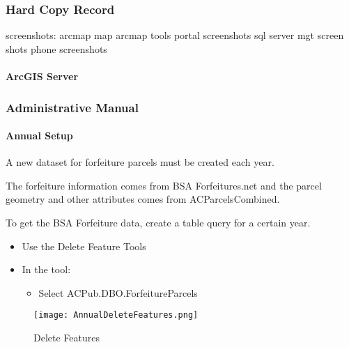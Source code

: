 \documentclass[class=book , crop=false, titlepage, twoside, multi={itemize, figure, verbatim}, float=false]{standalone}
\begin{document}
\subsubsection{Hard Copy Record}
screenshots:
arcmap map
arcmap tools
portal screenshots
sql server mgt screen shots
phone screenshots

\paragraph{ArcGIS Server}
\clearpage
%
%
%
\subsubsection{Administrative Manual}
\vspace{.25in}

\paragraph[Annual Setup]{Annual Setup \texorpdfstring{\\}{}}

A new dataset for forfeiture parcels must be created each year.

\noindent The forfeiture information comes from BSA Forfeitures.net and the parcel geometry and other attributes comes from ACParcelsCombined.
\vspace{.25in}

\noindent To get the BSA Forfeiture data, create a table query for a certain year.
\vspace{.25in}

\vspace{.25in}

\begin{itemize}
\item {\Large Use the Delete Feature Tools}
\item {\Large In the tool:}
\begin{itemize}
\item Select ACPub.DBO.ForfeitureParcels
\end{itemize}
\end{itemize}
\vspace{.25in}

%
%
\begin{figure}[h!]
\centering
    \texttt{[image: AnnualDeleteFeatures.png]}
\caption{Delete Features}
\end{figure}
\vspace{.25in}
\end{document}
